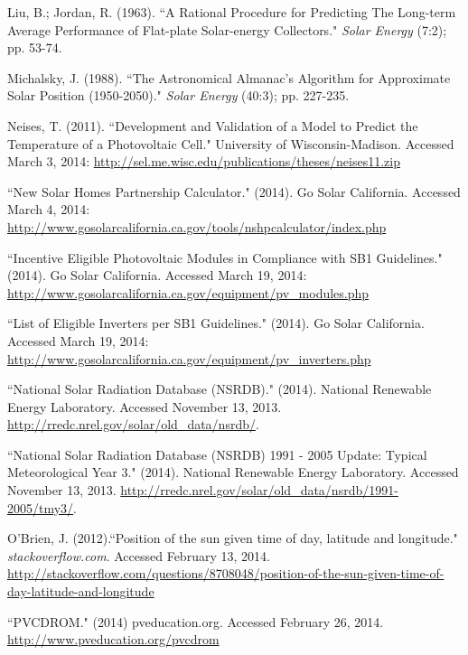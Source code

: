 \documentclass[12pt,letterpaper]{article}
\begin{document}
\begin{thebibliography}{99}
 Liu, B.; Jordan, R. (1963). ``A Rational Procedure for Predicting The Long-term Average Performance of Flat-plate Solar-energy Collectors." \textit{Solar Energy} (7:2); pp. 53-74.

 Michalsky, J. (1988). ``The Astronomical Almanac's Algorithm for Approximate Solar Position (1950-2050)." \textit{Solar Energy} (40:3); pp. 227-235.

 Neises, T. (2011). ``Development and Validation of a Model to Predict the Temperature of a Photovoltaic Cell." University of Wisconsin-Madison. Accessed March 3, 2014: \url{http://sel.me.wisc.edu/publications/theses/neises11.zip}

 ``New Solar Homes Partnership Calculator." (2014). Go Solar California. Accessed March 4, 2014: \url{http://www.gosolarcalifornia.ca.gov/tools/nshpcalculator/index.php}

 ``Incentive Eligible Photovoltaic Modules in Compliance with SB1 Guidelines." (2014). Go Solar California. Accessed March 19, 2014:
 \url{http://www.gosolarcalifornia.ca.gov/equipment/pv_modules.php}

 ``List of Eligible Inverters per SB1 Guidelines." (2014). Go Solar California. Accessed March 19, 2014:
 \url{http://www.gosolarcalifornia.ca.gov/equipment/pv_inverters.php}

 ``National Solar Radiation Database (NSRDB)." (2014). National Renewable Energy Laboratory.  Accessed November 13, 2013. \url{http://rredc.nrel.gov/solar/old_data/nsrdb/}.

 ``National Solar Radiation Database (NSRDB) 1991 - 2005 Update: Typical Meteorological Year 3." (2014). National Renewable Energy Laboratory. Accessed November 13, 2013. \url{http://rredc.nrel.gov/solar/old\_data/nsrdb/1991-2005/tmy3/}.

 O'Brien, J. (2012).``Position of the sun given time of day, latitude and longitude." \textit{stackoverflow.com}. Accessed February 13, 2014. \url{http://stackoverflow.com/questions/8708048/position-of-the-sun-given-time-of-day-latitude-and-longitude}

 ``PVCDROM." (2014) pveducation.org. Accessed February 26, 2014. \url{http://www.pveducation.org/pvcdrom}


\end{thebibliography}
\end{document}
